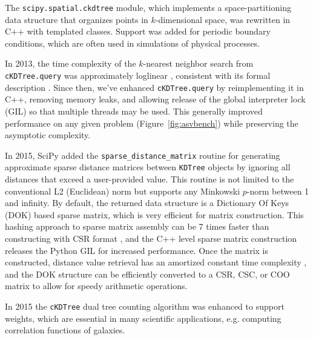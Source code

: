 The \texttt{scipy.spatial.ckdtree} module, which implements a space-partitioning data structure that
organizes points in $k$-dimensional space, was rewritten in C++ with templated classes.
Support was added for periodic boundary conditions, which are often used
in simulations of physical processes.

In 2013, the time complexity of the $k$-nearest neighbor search from
\texttt{cKDTree.query} was approximately loglinear \cite{knn-jake},
consistent with its formal description \cite{kdtree-search-algo}.
Since then, we've enhanced \texttt{cKDTree.query} by reimplementing it in
C++, removing memory leaks, and allowing release of the global interpreter lock (GIL) so that
multiple threads may be used\cite{gh-4374}. This generally improved
performance on any given problem (Figure~\ref{fig:asvbench})
while preserving the asymptotic complexity.

In 2015, SciPy added the \texttt{sparse\_distance\_matrix} routine for generating
approximate sparse distance matrices between \texttt{KDTree} objects by ignoring
all distances that exceed a user-provided value. This routine is not
limited to the conventional L2 (Euclidean) norm but supports any Minkowski
$p$-norm between 1 and infinity. By default, the returned data structure is a
Dictionary Of Keys (DOK) based sparse matrix, which is very efficient for matrix
construction. This hashing approach to sparse matrix assembly can be 7 times
faster than constructing with CSR format
\cite{10.1007/978-3-540-75755-9_107}, and the C++ level sparse matrix construction
releases the Python GIL for increased performance. Once the matrix is constructed,
distance value retrieval has an amortized constant time complexity
\cite{Cormen:2001:IA:580470}, and the DOK structure can be efficiently converted
to a CSR, CSC, or COO matrix to allow for
speedy arithmetic operations.

In 2015 the \texttt{cKDTree} dual tree counting algorithm\cite{Moore2000ar}
was enhanced to support weights\cite{ckdtree-weights}, which are
essential in many scientific applications, e.g. computing correlation
functions of galaxies\cite{0004-637X-750-1-38}.
